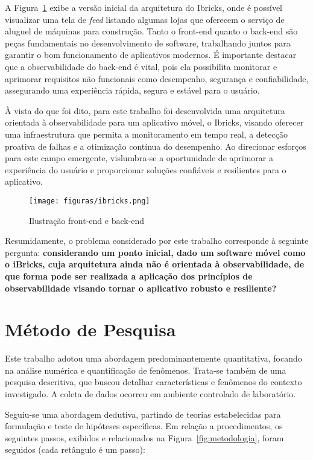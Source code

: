 \documentclass[12pt]{article}
\begin{document}
A Figura~\ref{fig:frontendIbricks} exibe a versão inicial da arquitetura do Ibricks, onde é possível visualizar uma tela de \textit{feed} listando algumas lojas que oferecem o serviço de aluguel de máquinas para construção. Tanto o front-end quanto o back-end são peças fundamentais no desenvolvimento de software, trabalhando juntos para garantir o bom funcionamento de aplicativos modernos. É importante destacar que a observabilidade do back-end é vital, pois ela possibilita monitorar e aprimorar requisitos não funcionais como desempenho, segurança e confiabilidade,  assegurando uma experiência rápida, segura e estável para o usuário.

À vista do que foi dito, para este trabalho foi desenvolvida uma arquitetura orientada à observabilidade para um aplicativo móvel, o Ibricks, visando oferecer uma infraestrutura que permita a monitoramento em tempo real, a detecção proativa de falhas e a otimização contínua do desempenho. Ao direcionar esforços para este campo emergente, vislumbra-se a oportunidade de aprimorar a experiência do usuário e proporcionar soluções confiáveis e resilientes para o aplicativo.

\begin{figure}[!htb]
\centering
\texttt{[image: figuras/ibricks.png]}
\caption{Ilustração front-end e back-end}
\label{fig:frontendIbricks}
\end{figure}

Resumidamente, o problema considerado por este trabalho corresponde à seguinte pergunta: \textbf{considerando um ponto inicial, dado um software móvel como o iBricks, cuja arquitetura ainda não é orientada à observabilidade, de que forma pode ser realizada a aplicação dos princípios de observabilidade visando tornar o aplicativo robusto e resiliente?}

\section{Método de Pesquisa} \label{sec:metodo}

Este trabalho adotou uma abordagem predominantemente quantitativa, focando na análise numérica e quantificação de fenômenos. Trata-se também de uma pesquisa descritiva, que buscou detalhar características e fenômenos do contexto investigado. A coleta de dados ocorreu em ambiente controlado de laboratório.

Seguiu-se uma abordagem dedutiva, partindo de teorias estabelecidas para formulação e teste de hipóteses específicas. Em relação a procedimentos, os seguintes passos, exibidos e relacionados na Figura~\ref{fig:metodologia}, foram seguidos (cada retângulo é um passo):
\end{document}
